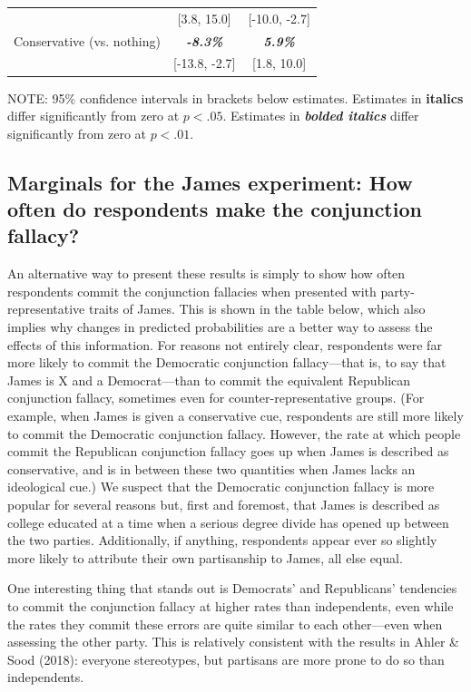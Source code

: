 \documentclass[12pt, letterpaper]{article}
\begin{document}
\begin{table}
\begin{center}
\begin{tabular}{l|cc|}
\multicolumn{1}{|l|}{} & [3.8, 15.0] & [-10.0, -2.7] \\ 
\multicolumn{1}{|l|}{Conservative (vs. nothing)}    & \textbf{\emph{-8.3\%}}                                                            & \textbf{\emph{5.9\%}}                                                                   \\
\multicolumn{1}{|l|}{} & [-13.8, -2.7] & [1.8, 10.0] \\ 
\hline
\end{tabular}
\end{center}
\scriptsize{NOTE: 95\% confidence intervals in brackets below estimates. Estimates in \textbf{italics} differ significantly from zero at $p<.05$. Estimates in \textbf{\emph{bolded italics}} differ significantly from zero at $p<.01$.}
\end{table}

\clearpage
\subsection{Marginals for the James experiment: How often do respondents make the conjunction fallacy?} \label{si:marginals}

An alternative way to present these results is simply to show how often respondents commit the conjunction fallacies when presented with party-representative traits of James. This is shown in the table below, which also implies why changes in predicted probabilities are a better way to assess the effects of this information. For reasons not entirely clear, respondents were far more likely to commit the Democratic conjunction fallacy---that is, to say that James is X and a Democrat---than to commit the equivalent Republican conjunction fallacy, sometimes even for counter-representative groups. (For example, when James is given a conservative cue, respondents are still more likely to commit the Democratic conjunction fallacy. However, the rate at which people commit the Republican conjunction fallacy goes up when James is described as conservative, and is in between these two quantities when James lacks an ideological cue.) We suspect that the Democratic conjunction fallacy is more popular for several reasons but, first and foremost, that James is described as college educated at a time when a serious degree divide has opened up between the two parties. Additionally, if anything, respondents appear ever so slightly more likely to attribute their own partisanship to James, all else equal.

One interesting thing that stands out is Democrats' and Republicans' tendencies to commit the conjunction fallacy at higher rates than independents, even while the rates they commit these errors are quite similar to each other---even when assessing the other party. This is relatively consistent with the results in Ahler \& Sood (2018): everyone stereotypes, but partisans are more prone to do so than independents.
\end{document}

